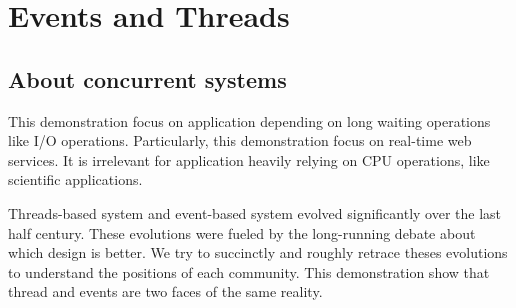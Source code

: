 \chapter{Events and Threads}
















\section{About concurrent systems}

This demonstration focus on application depending on long waiting operations like I/O operations.
Particularly, this demonstration focus on real-time web services.
It is irrelevant for application heavily relying on CPU operations, like scientific applications.

Threads-based system and event-based system evolved significantly over the last half century.
These evolutions were fueled by the long-running debate about which design is better.
We try to succinctly and roughly retrace theses evolutions to understand the positions of each community.
This demonstration show that thread and events are two faces of the same reality.

